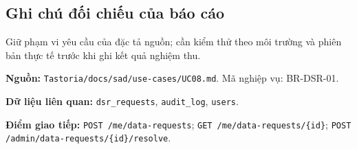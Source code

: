 \subsection{Ghi chú đối chiếu của báo cáo}
Giữ phạm vi yêu cầu của đặc tả nguồn; cần kiểm thử theo môi trường và phiên bản thực tế trước khi ghi kết quả nghiệm thu.

\textbf{Nguồn:} {\small\texttt{Tastoria/\allowbreak{}\allowbreak{}docs/\allowbreak{}\allowbreak{}sad/\allowbreak{}\allowbreak{}use-\allowbreak{}cases/\allowbreak{}\allowbreak{}UC08.\allowbreak{}md}}. Mã nghiệp vụ: BR-\allowbreak{}DSR-\allowbreak{}01.

\textbf{Dữ liệu liên quan:} {\small\texttt{dsr\_\allowbreak{}\allowbreak{}requests}}, {\small\texttt{audit\_\allowbreak{}\allowbreak{}log}}, {\small\texttt{users}}.

\textbf{Điểm giao tiếp:} {\small\texttt{POST /\allowbreak{}\allowbreak{}me/\allowbreak{}\allowbreak{}data-\allowbreak{}requests}}; {\small\texttt{GET /\allowbreak{}\allowbreak{}me/\allowbreak{}\allowbreak{}data-\allowbreak{}requests/\allowbreak{}\allowbreak{}\{id\}}}; {\small\texttt{POST /\allowbreak{}\allowbreak{}admin/\allowbreak{}\allowbreak{}data-\allowbreak{}requests/\allowbreak{}\allowbreak{}\{id\}/\allowbreak{}\allowbreak{}resolve}}.
